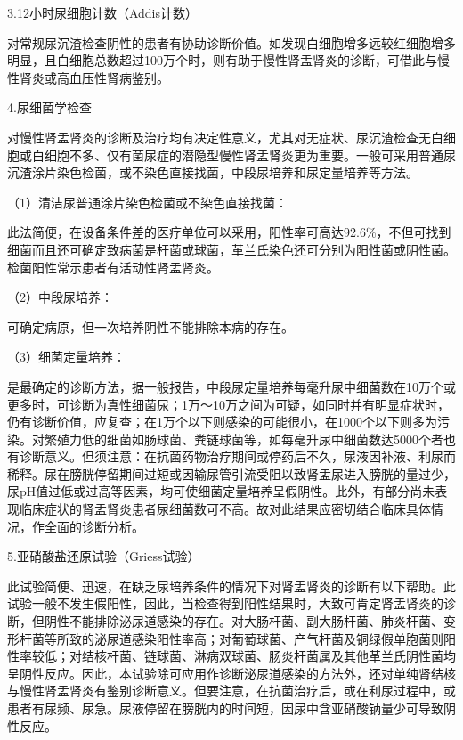 \hypertarget{text00283.htmlux5cux23CHP36-4-3-1-1-2-3}{}
3.12小时尿细胞计数（Addis计数）

对常规尿沉渣检查阴性的患者有协助诊断价值。如发现白细胞增多远较红细胞增多明显，且白细胞总数超过100万个时，则有助于慢性肾盂肾炎的诊断，可借此与慢性肾炎或高血压性肾病鉴别。

\hypertarget{text00283.htmlux5cux23CHP36-4-3-1-1-2-4}{}
4.尿细菌学检查

对慢性肾盂肾炎的诊断及治疗均有决定性意义，尤其对无症状、尿沉渣检查无白细胞或白细胞不多、仅有菌尿症的潜隐型慢性肾盂肾炎更为重要。一般可采用普通尿沉渣涂片染色检菌，或不染色直接找菌，中段尿培养和尿定量培养等方法。

\hypertarget{text00283.htmlux5cux23CHP36-4-3-1-1-2-4-1}{}
（1）清洁尿普通涂片染色检菌或不染色直接找菌：

此法简便，在设备条件差的医疗单位可以采用，阳性率可高达92.6\%，不但可找到细菌而且还可确定致病菌是杆菌或球菌，革兰氏染色还可分别为阳性菌或阴性菌。检菌阳性常示患者有活动性肾盂肾炎。

\hypertarget{text00283.htmlux5cux23CHP36-4-3-1-1-2-4-2}{}
（2）中段尿培养：

可确定病原，但一次培养阴性不能排除本病的存在。

\hypertarget{text00283.htmlux5cux23CHP36-4-3-1-1-2-4-3}{}
（3）细菌定量培养：

是最确定的诊断方法，据一般报告，中段尿定量培养每毫升尿中细菌数在10万个或更多时，可诊断为真性细菌尿；1万～10万之间为可疑，如同时并有明显症状时，仍有诊断价值，应复查；在1万个以下则感染的可能很小，在1000个以下则多为污染。对繁殖力低的细菌如肠球菌、粪链球菌等，如每毫升尿中细菌数达5000个者也有诊断意义。但须注意：在抗菌药物治疗期间或停药后不久，尿液因补液、利尿而稀释。尿在膀胱停留期间过短或因输尿管引流受阻以致肾盂尿进入膀胱的量过少，尿pH值过低或过高等因素，均可使细菌定量培养呈假阴性。此外，有部分尚未表现临床症状的肾盂肾炎患者尿细菌数可不高。故对此结果应密切结合临床具体情况，作全面的诊断分析。

\hypertarget{text00283.htmlux5cux23CHP36-4-3-1-1-2-5}{}
5.亚硝酸盐还原试验（Griess试验）

此试验简便、迅速，在缺乏尿培养条件的情况下对肾盂肾炎的诊断有以下帮助。此试验一般不发生假阳性，因此，当检查得到阳性结果时，大致可肯定肾盂肾炎的诊断，但阴性不能排除泌尿道感染的存在。对大肠杆菌、副大肠杆菌、肺炎杆菌、变形杆菌等所致的泌尿道感染阳性率高；对葡萄球菌、产气杆菌及铜绿假单胞菌则阳性率较低；对结核杆菌、链球菌、淋病双球菌、肠炎杆菌属及其他革兰氏阴性菌均呈阴性反应。因此，本试验除可应用作诊断泌尿道感染的方法外，还对单纯肾结核与慢性肾盂肾炎有鉴别诊断意义。但要注意，在抗菌治疗后，或在利尿过程中，或患者有尿频、尿急。尿液停留在膀胱内的时间短，因尿中含亚硝酸钠量少可导致阴性反应。

